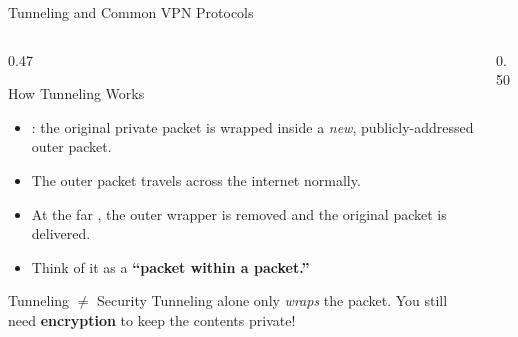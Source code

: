 \documentclass[aspectratio=169]{beamer}  %
\begin{document}
\begin{frame}[t]{Tunneling and Common VPN Protocols}
    \begin{columns}[T]
        \begin{column}{0.47\textwidth}
            \begin{block}{How Tunneling Works}
                \begin{itemize}
                    \footnotesize
                    \item {}: the original private packet is wrapped inside a \textit{new}, publicly-addressed outer packet.
                    \item The outer packet travels across the internet normally.
                    \item At the far , the outer wrapper is removed and the original packet is delivered.
                    \item Think of it as a \textbf{``packet within a packet.''}
                \end{itemize}
            \end{block}
            \vspace{0.2em}
            \begin{alertblock}{\footnotesize Tunneling $\neq$ Security}
                \footnotesize Tunneling alone only \textit{wraps} the packet. You still need \textbf{encryption} to keep the contents private!
            \end{alertblock}
        \end{column}
        \begin{column}{0.50\textwidth}
            \begin{center}
\end{center}
\end{column}
\end{columns}
\end{frame}
\end{document}
